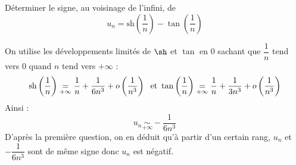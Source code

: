 \documentclass[a4paper,10pt]{report}
\begin{document}
\begin{Exa} D\'{e}terminer le signe, au voisinage de l'infini, de 
$$u_{n}=\text{sh}\left( \dfrac{1}{n}\right) -\tan \left( \dfrac{1}{n}\right)$$
\end{Exa}

\corr On utilise les développements limités de $\sh$ et $\tan$ en $0$ sachant que $\dfrac{1}{n}$ tend vers $0$ quand $n$ tend vers $+ \infty$ : 
$$\textrm{sh} \left(\dfrac{1}{n} \right) \underset{+ \infty}{=} \dfrac{1}{n} + \dfrac{1}{{6n^3 }} + o\left( {\dfrac{1}{{n^3 }}} \right) \; \hbox{ et } \tan \left(\dfrac{1}{n}\right) \underset{+ \infty}{=} \dfrac{1}{n} + \dfrac{1}{{3n^3 }} + o\left( {\dfrac{1}{{n^3 }}} \right)$$
Ainsi :
$$u_n  \underset{+ \infty}{\sim } - \dfrac{1}{{6n^3 }}$$
D'après la première question, on en déduit qu'à partir d'un certain rang, $u_n$ et $ - \dfrac{1}{{6n^3 }}$ sont de même signe donc $u_n$ est négatif.
\end{document}
